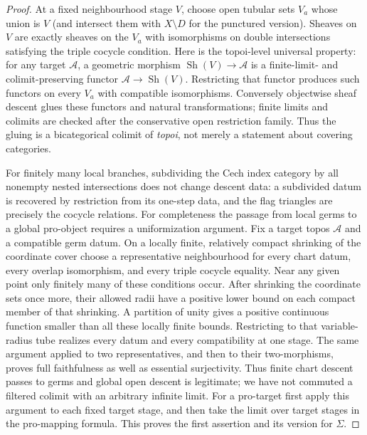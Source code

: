 \begin{proof}
At a fixed neighbourhood stage $V$, choose open tubular sets $V_a$ whose
union is $V$ (and intersect them with $X\setminus D$ for the punctured
version). Sheaves on $V$ are exactly sheaves on the $V_a$ with
isomorphisms on double intersections satisfying the triple cocycle
condition. Here is the topoi-level universal property: for any target
$\mathcal A$, a geometric morphism $\operatorname{Sh}(V)\to\mathcal A$
is a finite-limit- and colimit-preserving functor
$\mathcal A\to\operatorname{Sh}(V)$. Restricting that functor produces
such functors on every $V_a$ with compatible isomorphisms. Conversely
objectwise sheaf descent glues these functors and natural transformations;
finite limits and colimits are checked after the conservative open
restriction family. Thus the gluing is a bicategorical colimit of
\emph{topoi}, not merely a statement about covering categories.

For finitely many local branches, subdividing the Cech index category by
all nonempty nested intersections does not change descent data: a
subdivided datum is recovered by restriction from its one-step data, and
the flag triangles are precisely the cocycle relations. For completeness the passage from local germs to a global pro-object
requires a uniformization argument. Fix a target topos $\mathcal A$ and a
compatible germ datum. On a locally finite, relatively compact shrinking
of the coordinate cover choose a representative neighbourhood for every
chart datum, every overlap isomorphism, and every triple cocycle equality.
Near any given point only finitely many of these conditions occur.
After shrinking the coordinate sets once more, their allowed radii have
a positive lower bound on each compact member of that shrinking. A
partition of unity gives a positive continuous function smaller than all
these locally finite bounds. Restricting to that variable-radius tube
realizes every datum and every compatibility at one stage. The same
argument applied to two representatives, and then to their two-morphisms,
proves full faithfulness as well as essential surjectivity. Thus finite
chart descent passes to germs and global open descent is legitimate;
we have not commuted a filtered colimit with an arbitrary infinite
limit. For a pro-target first apply this argument to each fixed target
stage, and then take the limit over target stages in the pro-mapping
formula. This proves the first assertion and its version for $\Sigma$.


\end{proof}

